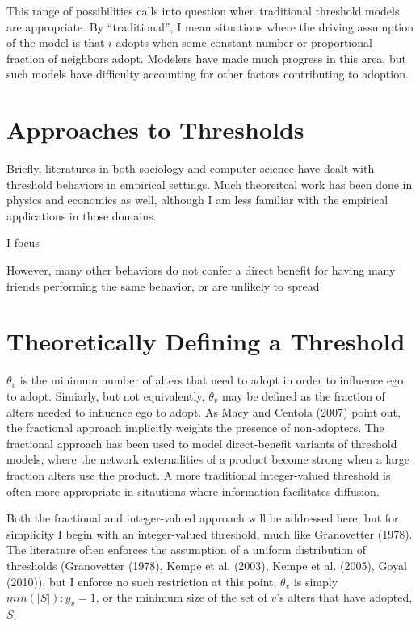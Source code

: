 \documentclass{article}
\begin{document}
This range of possibilities calls into question when traditional threshold models are appropriate. By ``traditional'', I mean situations where the driving assumption of the model is that $i$ adopts when some constant number or proportional fraction of neighbors adopt. Modelers have made much progress in this area, but such models have difficulty accounting for other factors contributing to adoption.

\section{Approaches to Thresholds}

Briefly, literatures in both sociology and computer science have dealt with threshold behaviors in empirical settings. Much theoreitcal work has been done in physics and economics as well, although I am less familiar with the empirical applications in those domains.

I focus


However, many other behaviors do not confer a direct benefit for having many friends performing the same behavior, or are unlikely to spread 




\section{Theoretically Defining a Threshold}

$\theta_v$ is the minimum number of alters that need to adopt in order to influence ego to adopt. Simiarly, but not equivalently, $\theta_v$ may be defined as the fraction of alters needed to influence ego to adopt. As Macy and Centola (2007) point out, the fractional approach implicitly weights the presence of non-adopters. The fractional approach has been used to model direct-benefit variants of threshold models, where the network externalities of a product become strong when a large fraction alters use the product. A more traditional integer-valued threshold is often more appropriate in sitautions where information facilitates diffusion. 

Both the fractional and integer-valued approach will be addressed here, but for simplicity I begin with an integer-valued threshold, much like Granovetter (1978). The literature often enforces the assumption of a uniform distribution of thresholds (Granovetter (1978), Kempe et al. (2003), Kempe et al. (2005), Goyal (2010)), but I enforce no such restriction at this point. $\theta_v$ is simply $min(|S|): y_v = 1$, or the minimum size of the set of $v$'s alters that have adopted, $S$.
\end{document}
